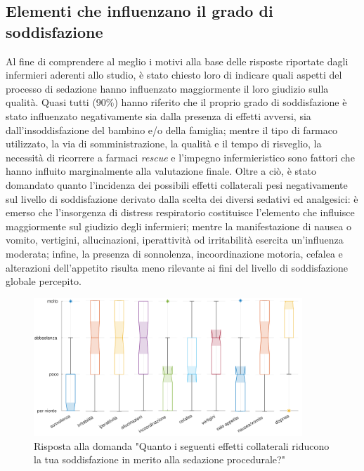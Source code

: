 \subsection*{Elementi che influenzano il grado di soddisfazione}

Al fine di comprendere al meglio i motivi alla base delle risposte riportate dagli infermieri aderenti allo studio, è stato chiesto loro di indicare quali aspetti del processo di sedazione hanno influenzato maggiormente il loro giudizio sulla qualità. Quasi tutti (90$\%$) hanno riferito che il proprio grado di soddisfazione è stato influenzato negativamente sia dalla presenza di effetti avversi, sia dall'insoddisfazione del bambino e/o della famiglia; mentre il tipo di farmaco utilizzato, la via di somministrazione, la qualità e il tempo di risveglio, la necessità di ricorrere a farmaci \emph{rescue} e l'impegno infermieristico sono fattori che hanno influito marginalmente alla valutazione finale.
Oltre a ciò, è stato domandato quanto l'incidenza dei possibili effetti collaterali pesi negativamente sul livello di soddisfazione derivato dalla scelta dei diversi sedativi ed analgesici: è emerso che l'insorgenza di distress respiratorio costituisce l'elemento che influisce maggiormente sul giudizio degli infermieri; mentre la manifestazione di nausea o vomito, vertigini, allucinazioni, iperattività od irritabilità esercita un'influenza moderata; infine, la presenza di sonnolenza, incoordinazione motoria, cefalea e alterazioni dell'appetito risulta meno rilevante ai fini del livello di soddisfazione globale percepito. 

\begin{figure}[h]
    \centering
    \includegraphics[width=0.9\textwidth]{Figure/influenza-effetti.pdf}
    \caption{Risposta alla domanda "Quanto i seguenti effetti collaterali riducono la tua soddisfazione in merito alla sedazione procedurale?"}
    \label{fig:influenzaeffetti}
\end{figure}


